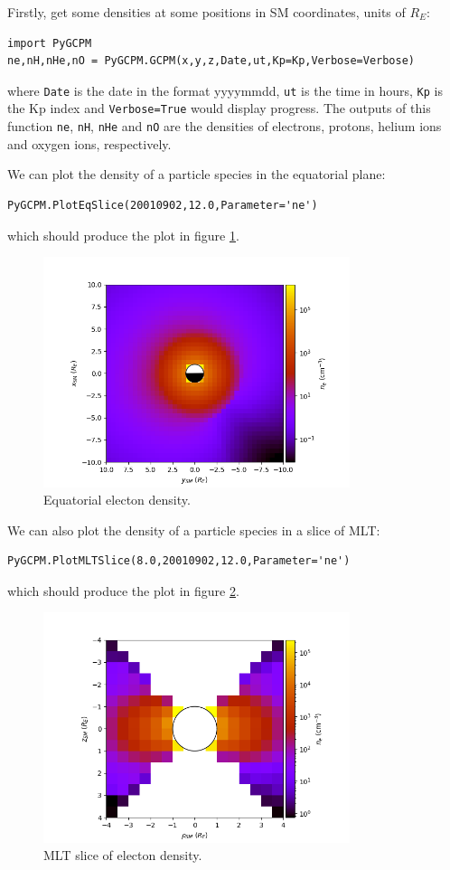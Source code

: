 			Firstly, get some densities at some positions in SM coordinates, units of $R_E$:
			\begin{verbatim}
import PyGCPM
ne,nH,nHe,nO = PyGCPM.GCPM(x,y,z,Date,ut,Kp=Kp,Verbose=Verbose)
			\end{verbatim}
			where \texttt{Date} is the date in the format yyyymmdd, \texttt{ut} is the time in hours, \texttt{Kp} is the Kp index and \texttt{Verbose=True} would display progress. The outputs of this function \texttt{ne}, \texttt{nH}, \texttt{nHe} and \texttt{nO} are the densities of electrons, protons, helium ions and oxygen ions, respectively.

			We can plot the density of a particle species in the equatorial plane:
			\begin{verbatim}
PyGCPM.PlotEqSlice(20010902,12.0,Parameter='ne')
			\end{verbatim}
			which should produce the plot in figure \ref{FigPyGCPMEq}.

			\begin{figure}
				\begin{center}
					\includegraphics[width=0.8\textwidth]{figures/ch2_pygcpm_equator.png}
				\end{center}
				\caption{Equatorial electon density. \label{FigPyGCPMEq}}
			\end{figure}

			We can also plot the density of a particle species in a slice of MLT:
			\begin{verbatim}
PyGCPM.PlotMLTSlice(8.0,20010902,12.0,Parameter='ne')
			\end{verbatim}
			which should produce the plot in figure \ref{FigPyGCPMMLT}.

			\begin{figure}
				\begin{center}
					\includegraphics[width=0.8\textwidth]{figures/ch2_pygcpm_mlt.png}
				\end{center}
				\caption{MLT slice of electon density. \label{FigPyGCPMMLT}}
			\end{figure}